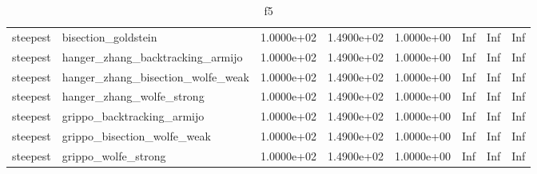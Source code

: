 \documentclass[a4paper,11pt]{article}
\numberwithin{equation}{section} %
\begin{document}
\begin{table}[h!]
{\begin{tabular}{|l|l|l|l|l|l|l|l|}
        steepest & bisection\_goldstein & 1.0000e+02 & 1.4900e+02 & 1.0000e+00 & Inf & Inf & Inf \\
        steepest & hanger\_zhang\_backtracking\_armijo & 1.0000e+02 & 1.4900e+02 & 1.0000e+00 & Inf & Inf & Inf \\
        steepest & hanger\_zhang\_bisection\_wolfe\_weak & 1.0000e+02 & 1.4900e+02 & 1.0000e+00 & Inf & Inf & Inf \\
        steepest & hanger\_zhang\_wolfe\_strong & 1.0000e+02 & 1.4900e+02 & 1.0000e+00 & Inf & Inf & Inf \\
        steepest & grippo\_backtracking\_armijo & 1.0000e+02 & 1.4900e+02 & 1.0000e+00 & Inf & Inf & Inf \\
        steepest & grippo\_bisection\_wolfe\_weak & 1.0000e+02 & 1.4900e+02 & 1.0000e+00 & Inf & Inf & Inf \\
        steepest & grippo\_wolfe\_strong & 1.0000e+02 & 1.4900e+02 & 1.0000e+00 & Inf & Inf & Inf \\
\end{tabular}}
\caption{f5}
\label{table:f5}
\end{table}
\end{document}
